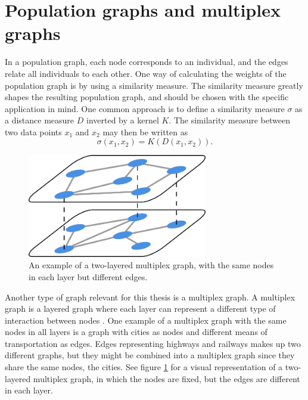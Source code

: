\section{Population graphs and multiplex graphs}
\label{sec:similarity_measure}

In a population graph, each node corresponds to an individual, and the edges relate all individuals to each other. One way of calculating the weights of the population graph is by using a similarity measure. The similarity measure greatly shapes the resulting population graph, and should be chosen with the specific application in mind. One common approach is to define a similarity measure $\sigma$ as a distance measure $D$ inverted by a kernel $K$. The similarity measure between two data points $x_1$ and $x_2$ may then be written as
\begin{equation}
    \sigma(x_1,x_2) = K \left(D\left(x_1, x_2\right) \right).
    \label{eq:similarity_measure}
\end{equation}

\begin{figure}[!htbp]
    \centering
    \includegraphics[width=0.7\textwidth]{chapters/images_theory/multiplex_graph.png}
    \caption{An example of a two-layered multiplex graph, with the same nodes in each layer but different edges.}
    \label{fig:multiplex_graph}
\end{figure}
Another type of graph relevant for this thesis is a multiplex graph. A multiplex graph is a layered graph where each layer can represent a different type of interaction between nodes \cite{multiplex_book_chap2}. One example of a multiplex graph with the same nodes in all layers is a graph with cities as nodes and different means of transportation as edges. Edges representing highways and railways makes up two different graphs, but they might be combined into a multiplex graph since they share the same nodes, the cities. See figure \ref{fig:multiplex_graph} for a visual representation of a two-layered multiplex graph, in which the nodes are fixed, but the edges are different in each layer.

